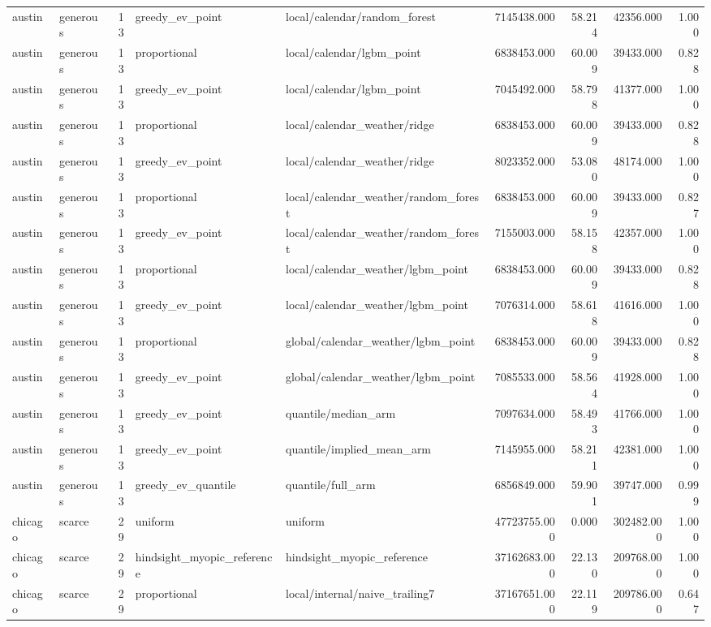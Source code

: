 \begin{tabular}{llrllrrrr}
austin & generous & 13 & greedy\_ev\_point & local/calendar/random\_forest & 7145438.000 & 58.214 & 42356.000 & 1.000 \\
austin & generous & 13 & proportional & local/calendar/lgbm\_point & 6838453.000 & 60.009 & 39433.000 & 0.828 \\
austin & generous & 13 & greedy\_ev\_point & local/calendar/lgbm\_point & 7045492.000 & 58.798 & 41377.000 & 1.000 \\
austin & generous & 13 & proportional & local/calendar\_weather/ridge & 6838453.000 & 60.009 & 39433.000 & 0.828 \\
austin & generous & 13 & greedy\_ev\_point & local/calendar\_weather/ridge & 8023352.000 & 53.080 & 48174.000 & 1.000 \\
austin & generous & 13 & proportional & local/calendar\_weather/random\_forest & 6838453.000 & 60.009 & 39433.000 & 0.827 \\
austin & generous & 13 & greedy\_ev\_point & local/calendar\_weather/random\_forest & 7155003.000 & 58.158 & 42357.000 & 1.000 \\
austin & generous & 13 & proportional & local/calendar\_weather/lgbm\_point & 6838453.000 & 60.009 & 39433.000 & 0.828 \\
austin & generous & 13 & greedy\_ev\_point & local/calendar\_weather/lgbm\_point & 7076314.000 & 58.618 & 41616.000 & 1.000 \\
austin & generous & 13 & proportional & global/calendar\_weather/lgbm\_point & 6838453.000 & 60.009 & 39433.000 & 0.828 \\
austin & generous & 13 & greedy\_ev\_point & global/calendar\_weather/lgbm\_point & 7085533.000 & 58.564 & 41928.000 & 1.000 \\
austin & generous & 13 & greedy\_ev\_point & quantile/median\_arm & 7097634.000 & 58.493 & 41766.000 & 1.000 \\
austin & generous & 13 & greedy\_ev\_point & quantile/implied\_mean\_arm & 7145955.000 & 58.211 & 42381.000 & 1.000 \\
austin & generous & 13 & greedy\_ev\_quantile & quantile/full\_arm & 6856849.000 & 59.901 & 39747.000 & 0.999 \\
chicago & scarce & 29 & uniform & uniform & 47723755.000 & 0.000 & 302482.000 & 1.000 \\
chicago & scarce & 29 & hindsight\_myopic\_reference & hindsight\_myopic\_reference & 37162683.000 & 22.130 & 209768.000 & 1.000 \\
chicago & scarce & 29 & proportional & local/internal/naive\_trailing7 & 37167651.000 & 22.119 & 209786.000 & 0.647 \\

\end{tabular}
